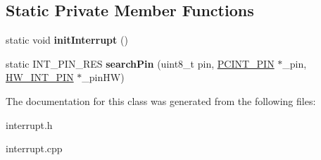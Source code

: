 \subsection*{Static Private Member Functions}
\begin{DoxyCompactItemize}
\item 
\mbox{\label{classInterrupt_acf51bc7c69619e4ccd95e90ff31aa286}} 
static void {\bfseries init\+Interrupt} ()
\item 
\mbox{\label{classInterrupt_a262ad3f1bb4a5cdf24a356b20d037a56}} 
static I\+N\+T\+\_\+\+P\+I\+N\+\_\+\+R\+ES {\bfseries search\+Pin} (uint8\+\_\+t pin, \mbox{\hyperlink{structPCINT__PIN}{P\+C\+I\+N\+T\+\_\+\+P\+IN}} $\ast$\+\_\+pin, \mbox{\hyperlink{structHW__INT__PIN}{H\+W\+\_\+\+I\+N\+T\+\_\+\+P\+IN}} $\ast$\+\_\+pin\+HW)
\end{DoxyCompactItemize}


The documentation for this class was generated from the following files\+:\begin{DoxyCompactItemize}
\item 
interrupt.\+h\item 
interrupt.\+cpp\end{DoxyCompactItemize}
